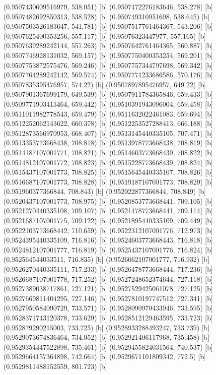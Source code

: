 {{{(0.9507430609516979, 538.051) [b] 
(0.9507472276183646, 538.278) [b] 
(0.9507482692850313, 538.528) [b] 
(0.950749310951698, 538.645) [b] 
(0.9507503526183647, 541.781) [b] 
(0.9507517761464367, 543.206) [b] 
(0.9507625400353256, 557.117) [b] 
(0.95076323447977, 557.165) [b] 
(0.9507639289242144, 557.263) [b] 
(0.9507642761464365, 560.887) [b] 
(0.9507746928131032, 569.157) [b] 
(0.9507750400353254, 569.201) [b] 
(0.9507753872575476, 569.246) [b] 
(0.9507757344797698, 569.342) [b] 
(0.9507764289242142, 569.574) [b] 
(0.9507771233686586, 570.176) [b] 
(0.9507835395476957, 574.22) [b] 
(0.9507897895476957, 649.22) [b] 
(0.9507901367699179, 649.539) [b] 
(0.9507911784365846, 659.433) [b] 
(0.9509771903413464, 659.442) [b] 
(0.9510391943096004, 659.458) [b] 
(0.9511011982778543, 659.479) [b] 
(0.9511632022461083, 659.694) [b] 
(0.9512252062143622, 660.378) [b] 
(0.9512253527288413, 666.188) [b] 
(0.9512873566970953, 668.407) [b] 
(0.9513145440335105, 707.471) [b] 
(0.9513353773668438, 708.818) [b] 
(0.9513978773668438, 708.819) [b] 
(0.9514187107001771, 708.821) [b] 
(0.9514603773668439, 708.822) [b] 
(0.9514812107001772, 708.823) [b] 
(0.9515228773668439, 708.824) [b] 
(0.9515437107001773, 708.825) [b] 
(0.9515645440335107, 708.826) [b] 
(0.9516687107001773, 708.828) [b] 
(0.9519187107001773, 708.829) [b] 
(0.951960377366844, 708.843) [b] 
(0.952022877366844, 708.849) [b] 
(0.9520437107001773, 708.975) [b] 
(0.9520853773668441, 709.105) [b] 
(0.9521270440335108, 709.107) [b] 
(0.9521478773668441, 709.114) [b] 
(0.9521687107001775, 709.122) [b] 
(0.9521895440335109, 709.449) [b] 
(0.9522103773668442, 710.659) [b] 
(0.9522312107001776, 712.973) [b] 
(0.9524395440335109, 716.816) [b] 
(0.9524603773668443, 716.818) [b] 
(0.9524812107001777, 716.819) [b] 
(0.9525437107001776, 716.824) [b] 
(0.952564544033511, 716.835) [b] 
(0.9526062107001777, 716.932) [b] 
(0.9526270440335111, 717.233) [b] 
(0.9526478773668444, 717.236) [b] 
(0.9526687107001778, 717.252) [b] 
(0.9527248652374644, 727.118) [b] 
(0.9527389038717861, 727.121) [b] 
(0.9527529425061078, 727.125) [b] 
(0.9527669811404295, 727.146) [b] 
(0.9527810197747512, 727.341) [b] 
(0.9527950584090729, 733.571) [b] 
(0.9528090970433946, 733.595) [b] 
(0.9528371743120378, 733.629) [b] 
(0.9528512129463595, 733.723) [b] 
(0.952879290215003, 733.725) [b] 
(0.9528933288493247, 733.739) [b] 
(0.9529073674836464, 734.052) [b] 
(0.952921406117968, 735.458) [b] 
(0.9529354447522898, 735.461) [b] 
(0.9529455824031564, 740.537) [b] 
(0.9529664157364898, 742.664) [b] 
(0.9529671101809342, 772.5) [b] 
(0.9529811488152559, 801.723) [b] 
}}}
